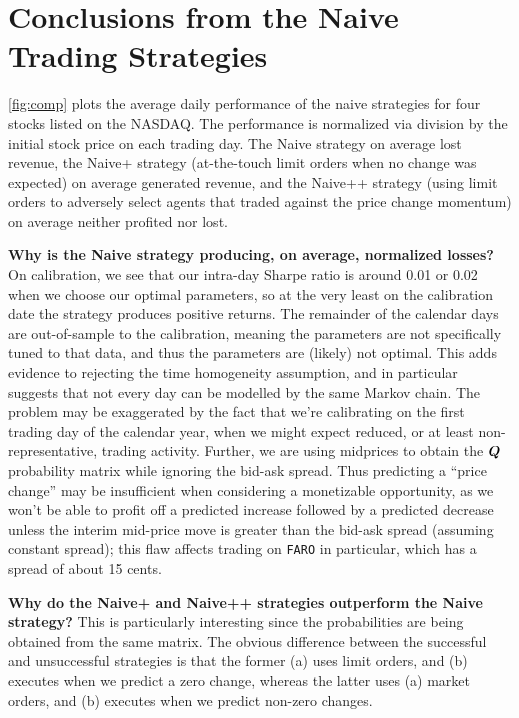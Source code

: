 \section{Conclusions from the Naive Trading Strategies}

\autoref{fig:comp} plots the average daily performance of the naive strategies for four stocks listed on the NASDAQ. The performance is normalized via division by the initial stock price on each trading day. The Naive strategy on average lost revenue, the Naive+ strategy (at-the-touch limit orders when no change was expected) on average generated revenue, and the Naive++ strategy (using limit orders to adversely select agents that traded against the price change momentum) on average neither profited nor lost.

{\bf Why is the Naive strategy producing, on average, normalized losses?} On calibration, we see that our intra-day Sharpe ratio is around 0.01 or 0.02 when we choose our optimal parameters, so at the very least on the calibration date the strategy produces positive returns. The remainder of the calendar days are out-of-sample to the calibration, meaning the parameters are not specifically tuned to that data, and thus the parameters are (likely) not optimal. This adds evidence to rejecting the time homogeneity assumption, and in particular suggests that not every day can be modelled by the same Markov chain. The problem may be exaggerated by the fact that we're calibrating on the first trading day of the calendar year, when we might expect reduced, or at least non-representative, trading activity. Further, we are using midprices to obtain the $\boldsymbol{Q}$ probability matrix while ignoring the bid-ask spread. Thus predicting a ``price change'' may be insufficient when considering a monetizable opportunity, as we won't be able to profit off a predicted increase followed by a predicted decrease unless the interim mid-price move is greater than the bid-ask spread (assuming constant spread); this flaw affects trading on \texttt{FARO} in particular, which has a spread of about 15 cents.

{\bf Why do the Naive+ and Naive++ strategies outperform the Naive strategy?} This is particularly interesting since the probabilities are being obtained from the same matrix. The obvious difference between the successful and unsuccessful strategies is that the former (a) uses limit orders, and (b) executes when we predict a zero change, whereas the latter uses (a) market orders, and (b) executes when we predict non-zero changes.

